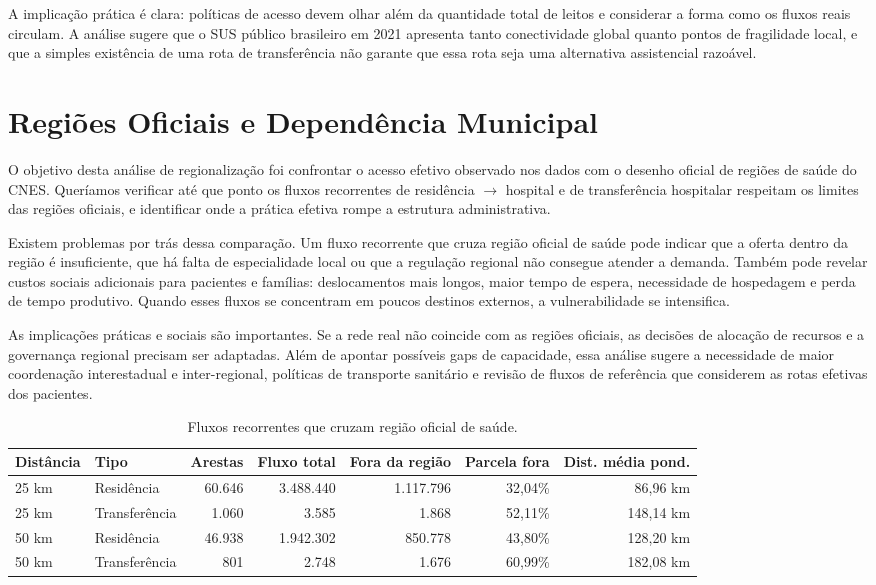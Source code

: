 \documentclass[10pt,a4paper]{article}
\begin{document}
A implicação prática é clara: políticas de acesso devem olhar além da quantidade total de leitos e considerar a forma como os fluxos reais circulam. A análise sugere que o SUS público brasileiro em 2021 apresenta tanto conectividade global quanto pontos de fragilidade local, e que a simples existência de uma rota de transferência não garante que essa rota seja uma alternativa assistencial razoável.

\section{Regiões Oficiais e Dependência Municipal}

O objetivo desta análise de regionalização foi confrontar o acesso efetivo observado nos dados com o desenho oficial de regiões de saúde do CNES. Queríamos verificar até que ponto os fluxos recorrentes de residência $\rightarrow$ hospital e de transferência hospitalar respeitam os limites das regiões oficiais, e identificar onde a prática efetiva rompe a estrutura administrativa.

Existem problemas por trás dessa comparação. Um fluxo recorrente que cruza região oficial de saúde pode indicar que a oferta dentro da região é insuficiente, que há falta de especialidade local ou que a regulação regional não consegue atender a demanda. Também pode revelar custos sociais adicionais para pacientes e famílias: deslocamentos mais longos, maior tempo de espera, necessidade de hospedagem e perda de tempo produtivo. Quando esses fluxos se concentram em poucos destinos externos, a vulnerabilidade se intensifica.

As implicações práticas e sociais são importantes. Se a rede real não coincide com as regiões oficiais, as decisões de alocação de recursos e a governança regional precisam ser adaptadas. Além de apontar possíveis gaps de capacidade, essa análise sugere a necessidade de maior coordenação interestadual e inter-regional, políticas de transporte sanitário e revisão de fluxos de referência que considerem as rotas efetivas dos pacientes.

\begin{table}[H]
\centering
\caption{Fluxos recorrentes que cruzam região oficial de saúde.}
\label{tab:regioes}
\scriptsize
\begin{tabular}{llrrrrr}
\toprule
Distância & Tipo & Arestas & Fluxo total & Fora da região & Parcela fora & Dist. média pond. \\
\midrule
25 km & Residência & 60.646 & 3.488.440 & 1.117.796 & 32,04\% & 86,96 km \\
25 km & Transferência & 1.060 & 3.585 & 1.868 & 52,11\% & 148,14 km \\
50 km & Residência & 46.938 & 1.942.302 & 850.778 & 43,80\% & 128,20 km \\
50 km & Transferência & 801 & 2.748 & 1.676 & 60,99\% & 182,08 km \\
\bottomrule
\end{tabular}
\end{table}
\end{document}
